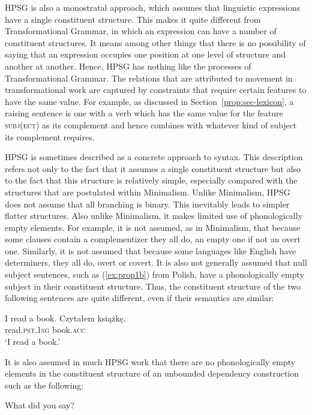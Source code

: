 \documentclass[output=paper
	        ,collection
	        ,collectionchapter
 	        ,biblatex
                ,babelshorthands
                ,newtxmath
                ,draftmode
                ,colorlinks, citecolor=brown
]{langscibook}
\begin{document}
HPSG is also a monostratal approach, which assumes that linguistic expressions have a single constituent structure. This makes it quite different from Transformational Grammar, in which an expression can have a number of constituent structures. It means among other things that there is no possibility of saying that an expression occupies one position at one level of structure and another at another. Hence, HPSG has nothing like the  processes of Transformational Grammar. The relations that are attributed to movement in transformational work are captured by constraints that require certain features to have the same value. For example, as discussed in Section~\ref{prop:sec-lexicon}, a raising sentence is one with a verb which has the same value for the feature \textsc{subj(ect)} as its complement and hence combines with whatever kind of subject its complement requires.

HPSG is sometimes described as a concrete approach to syntax. This description refers not only to the fact that it assumes a single constituent structure but also to the fact that this structure is relatively simple, especially compared with the structures that are postulated within Minimalism\indexmp. Unlike Minimalism, HPSG does not assume that all branching is binary. This inevitably leads to simpler flatter structures. Also unlike Minimalism, it makes limited use of phonologically empty elements. For example, it is not assumed, as in Minimalism, that because some clauses contain a complementizer they all do, an empty one if not an overt one. Similarly, it is not assumed that because some languages like English have determiners, they all do, overt or covert. It is also not generally assumed that null subject sentences, such as (\ref{ex:prop1b}) from Polish, have a phonologically empty subject in their constituent structure. Thus, the constituent structure of the two following sentences are quite different, even if their semantics are similar:

\eal\label{ex:prop1}
\ex\label{ex:prop1a}
I read a book.
\ex\label{ex:prop1b}
\gll Czytałem książkę.\\
     read\textsc{.pst.1sg} book\textsc{.acc}\\
\glt `I read a book.'
\zl

It is also assumed in much HPSG work that there are no phonologically empty elements in the constituent structure of an unbounded dependency construction such as the following:

\ea\label{ex:prop2}
What did you say?
\z
\end{document}
